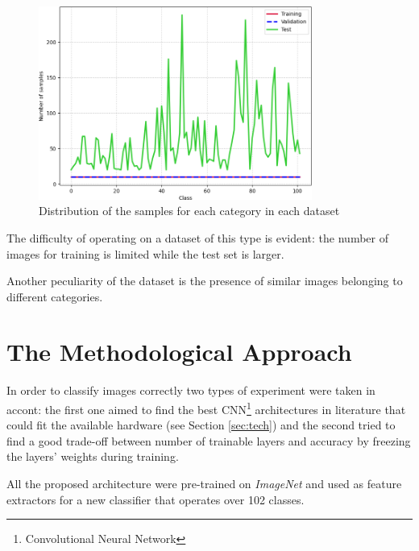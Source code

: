 \begin{figure}[ht!]
\centering
\includegraphics[width=0.8\textwidth]{images/dist.png} 
\caption{Distribution of the samples for each category in each dataset}
\label{fig:dist}
\end{figure}

The difficulty of operating on a dataset of this type is evident: the number of images for training is limited while the test set is larger. 

\par
Another peculiarity of the dataset is the presence of similar images belonging to different categories.



















\section{The Methodological Approach}

In order to classify images correctly two types of experiment were taken in accont: the first one aimed to find the best CNN\footnote{Convolutional Neural Network} architectures in 
literature that could fit the available hardware (see Section \ref{sec:tech}) and the second tried to find a good trade-off between number of trainable layers and accuracy by freezing the layers' weights during training. \par
All the proposed architecture were pre-trained on \textit{ImageNet}\cite{5206848} and used as feature extractors for a new classifier that operates over 102 classes.

